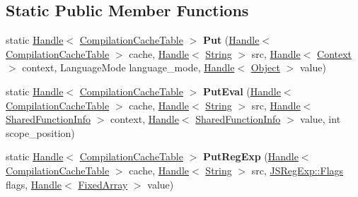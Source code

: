 \subsection*{Static Public Member Functions}
\begin{DoxyCompactItemize}
\item 
static \hyperlink{classv8_1_1internal_1_1_handle}{Handle}$<$ \hyperlink{classv8_1_1internal_1_1_compilation_cache_table}{Compilation\+Cache\+Table} $>$ {\bfseries Put} (\hyperlink{classv8_1_1internal_1_1_handle}{Handle}$<$ \hyperlink{classv8_1_1internal_1_1_compilation_cache_table}{Compilation\+Cache\+Table} $>$ cache, \hyperlink{classv8_1_1internal_1_1_handle}{Handle}$<$ \hyperlink{classv8_1_1internal_1_1_string}{String} $>$ src, \hyperlink{classv8_1_1internal_1_1_handle}{Handle}$<$ \hyperlink{classv8_1_1internal_1_1_context}{Context} $>$ context, Language\+Mode language\+\_\+mode, \hyperlink{classv8_1_1internal_1_1_handle}{Handle}$<$ \hyperlink{classv8_1_1internal_1_1_object}{Object} $>$ value)\hypertarget{classv8_1_1internal_1_1_compilation_cache_table_a5b64add8e11a4d166a83311ac474f0b5}{}\label{classv8_1_1internal_1_1_compilation_cache_table_a5b64add8e11a4d166a83311ac474f0b5}

\item 
static \hyperlink{classv8_1_1internal_1_1_handle}{Handle}$<$ \hyperlink{classv8_1_1internal_1_1_compilation_cache_table}{Compilation\+Cache\+Table} $>$ {\bfseries Put\+Eval} (\hyperlink{classv8_1_1internal_1_1_handle}{Handle}$<$ \hyperlink{classv8_1_1internal_1_1_compilation_cache_table}{Compilation\+Cache\+Table} $>$ cache, \hyperlink{classv8_1_1internal_1_1_handle}{Handle}$<$ \hyperlink{classv8_1_1internal_1_1_string}{String} $>$ src, \hyperlink{classv8_1_1internal_1_1_handle}{Handle}$<$ \hyperlink{classv8_1_1internal_1_1_shared_function_info}{Shared\+Function\+Info} $>$ context, \hyperlink{classv8_1_1internal_1_1_handle}{Handle}$<$ \hyperlink{classv8_1_1internal_1_1_shared_function_info}{Shared\+Function\+Info} $>$ value, int scope\+\_\+position)\hypertarget{classv8_1_1internal_1_1_compilation_cache_table_a31b05aecdf3b60535583dcb06c0dd267}{}\label{classv8_1_1internal_1_1_compilation_cache_table_a31b05aecdf3b60535583dcb06c0dd267}

\item 
static \hyperlink{classv8_1_1internal_1_1_handle}{Handle}$<$ \hyperlink{classv8_1_1internal_1_1_compilation_cache_table}{Compilation\+Cache\+Table} $>$ {\bfseries Put\+Reg\+Exp} (\hyperlink{classv8_1_1internal_1_1_handle}{Handle}$<$ \hyperlink{classv8_1_1internal_1_1_compilation_cache_table}{Compilation\+Cache\+Table} $>$ cache, \hyperlink{classv8_1_1internal_1_1_handle}{Handle}$<$ \hyperlink{classv8_1_1internal_1_1_string}{String} $>$ src, \hyperlink{classv8_1_1base_1_1_flags}{J\+S\+Reg\+Exp\+::\+Flags} flags, \hyperlink{classv8_1_1internal_1_1_handle}{Handle}$<$ \hyperlink{classv8_1_1internal_1_1_fixed_array}{Fixed\+Array} $>$ value)\hypertarget{classv8_1_1internal_1_1_compilation_cache_table_a0d5ff6bcfd3d4b9e5305b99fe8dfe33e}{}\label{classv8_1_1internal_1_1_compilation_cache_table_a0d5ff6bcfd3d4b9e5305b99fe8dfe33e}

\end{DoxyCompactItemize}

